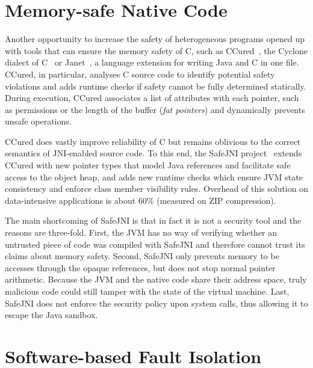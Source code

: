 \documentclass[a4paper,12pt,twoside,openright]{report}
\begin{document}
\section{Memory-safe Native Code}

Another opportunity to increase the safety of heterogeneous programs opened up with tools that can ensure the memory safety of C, such as CCured~\cite{necula2002ccured, Condit:2003:CRW:781131.781157}, the Cyclone dialect of C~\cite{Jim:2002:CSD:647057.713871} or Janet~\cite{Bubak:2001:CJN:1239921.1239925}, a language extension for writing Java and C in one file. CCured, in particular, analyses C source code to identify potential safety violations and adds runtime checks if safety cannot be fully determined statically. During execution, CCured associates a list of attributes with each pointer, such as permissions or the length of the buffer (\emph{fat pointers}) and dynamically prevents unsafe operations. 

CCured does vastly improve reliability of C but remains oblivious to the correct semantics of JNI-enabled source code. To this end, the SafeJNI project~\cite{Tan06safejava} extends CCured with new pointer types that model Java references and facilitate safe access to the object heap, and adds new runtime checks which ensure JVM state consistency and enforce class member visibility rules. Overhead of this solution on data-intensive applications is about 60\% (measured on ZIP compression).

The main shortcoming of SafeJNI is that in fact it is not a security tool and the reasons are three-fold. First, the JVM has no way of verifying whether an untrusted piece of code was compiled with SafeJNI and therefore cannot trust its claims about memory safety. Second, SafeJNI only prevents memory to be accesses through the opaque references, but does not stop normal pointer arithmetic. Because the JVM and the native code share their address space, truly malicious code could still tamper with the state of the virtual machine. Last, SafeJNI does not enforce the security policy upon system calls, thus allowing it to escape the Java sandbox.

\section{Software-based Fault Isolation}
\end{document}
